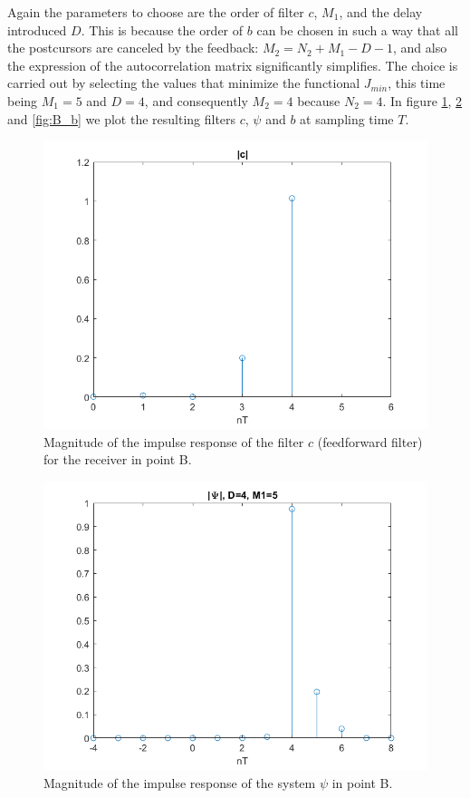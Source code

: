 \documentclass[a4paper,11.5pt]{article}
\begin{document}
Again the parameters to choose are the order of filter $c$, $M_1$, and the delay introduced $D$. This is because the order of $b$ can be chosen in such a way that all the postcursors are canceled by the feedback: $M_2=N_2+M_1-D-1$, and also the expression of the autocorrelation matrix significantly simplifies. The choice is carried out by selecting the values that minimize the functional $J_{min}$, this time being $M_1=5$ and $D=4$, and consequently $M_2=4$ because $N_2=4$. In figure \ref{fig:B_c}, \ref{fig:B_psi} and \ref{fig:B_b} we plot the resulting filters $c$, $\psi$ and $b$ at sampling time $T$. 

\begin{figure}[ht]
	\begin{center}   
		\includegraphics[width=\textwidth]{figs/B_c.png} 
		\caption{Magnitude of the impulse response of the filter $c$ (feedforward filter) for the receiver in point B.}
		\label{fig:B_c}
	\end{center}
\end{figure}

\begin{figure}[ht]
	\begin{center}   
		\includegraphics[width=\textwidth]{figs/B_psi.png} 
		\caption{Magnitude of the impulse response of the system $\psi$ in point B.}
		\label{fig:B_psi}
	\end{center}
\end{figure}
\end{document}
